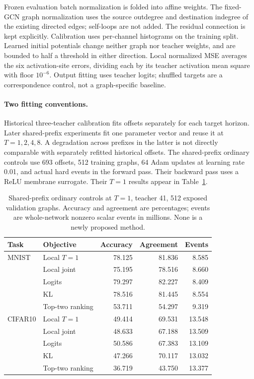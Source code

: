 \documentclass[10pt,twocolumn,letterpaper]{article}
\begin{document}
Frozen evaluation batch normalization is folded into affine weights. The fixed-GCN graph normalization uses the source outdegree and destination indegree of the existing directed edges; self-loops are not added. The residual connection is kept explicitly. Calibration uses per-channel histograms on the training split. Learned initial potentials change neither graph nor teacher weights, and are bounded to half a threshold in either direction. Local normalized MSE averages the six activation-site errors, dividing each by its teacher activation mean square with floor $10^{-6}$. Output fitting uses teacher logits; shuffled targets are a correspondence control, not a graph-specific baseline.

\paragraph{Two fitting conventions.} Historical three-teacher calibration fits offsets separately for each target horizon. Later shared-prefix experiments fit one parameter vector and reuse it at $T=1,2,4,8$. A degradation across prefixes in the latter is not directly comparable with separately refitted historical offsets. The shared-prefix ordinary controls use 693 offsets, 512 training graphs, 64 Adam updates at learning rate 0.01, and actual hard events in the forward pass. Their backward pass uses a ReLU membrane surrogate. Their $T=1$ results appear in Table~\ref{tab:objectives}.

\begin{table}[t]\centering\small
\caption{Shared-prefix ordinary controls at $T=1$, teacher 41, 512 exposed validation graphs. Accuracy and agreement are percentages; events are whole-network nonzero scalar events in millions. None is a newly proposed method.}
\label{tab:objectives}
\setlength{\tabcolsep}{3pt}\begin{tabular}{llrrr}\toprule
Task & Objective & Accuracy & Agreement & Events\\\midrule
MNIST & Local $T=1$ &78.125&81.836&8.585\\
 & Local joint &75.195&78.516&8.660\\
 & Logits &79.297&82.227&8.409\\
 & KL &78.516&81.445&8.554\\
 & Top-two ranking &53.711&54.297&9.319\\\midrule
CIFAR10 & Local $T=1$ &49.414&69.531&13.548\\
 & Local joint &48.633&67.188&13.509\\
 & Logits &50.586&67.383&13.109\\
 & KL &47.266&70.117&13.032\\
 & Top-two ranking &36.719&43.750&13.377\\\bottomrule
\end{tabular}\end{table}
\end{document}
